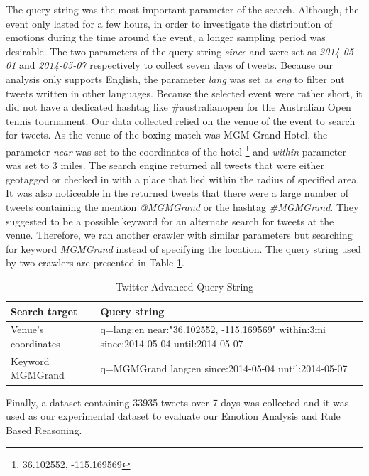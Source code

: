 The query string was the most important parameter of the search. Although, the event only lasted for a few hours, in order to investigate the distribution of emotions during the time around the event, a longer sampling period was desirable. The two parameters of the query string \textit{since} and  were set as \textit{2014-05-01} and \textit{2014-05-07} respectively to collect seven days of tweets. Because our analysis only supports English, the parameter \textit{lang} was set as \textit{eng} to filter out tweets written in other languages. Because the selected event were rather short, it did not have a dedicated hashtag like \#australianopen for the Australian Open tennis tournament. Our data collected relied on the venue of the event to search for tweets. As the venue of the boxing match was MGM Grand Hotel, the parameter \textit{near} was set to the coordinates of the hotel \footnote{36.102552, -115.169569} and \textit{within} parameter was set to 3 miles. The search engine returned all tweets that were either geotagged or checked in with a place that lied within the radius of specified area. It was also noticeable in the returned tweets that there were a large number of tweets containing the mention \textit{@MGMGrand} or the hashtag \textit{\#MGMGrand}. They suggested to be a possible keyword for an alternate search for tweets at the venue. Therefore, we ran another crawler with similar parameters but searching for keyword \textit{MGMGrand} instead of specifying the location. The query string used by two crawlers are presented in Table \ref{table:crawlerURL}. 

\begin{table}
\caption{Twitter Advanced Query String}
\label{table:crawlerURL}
\centering
\begin{tabular}{|p{4cm}|p{10cm}|}

\hline
\textbf{Search target} & \textbf{Query string} \\ \hline \hline
Venue's coordinates & q=lang:en near:"36.102552, -115.169569" within:3mi since:2014-05-04 until:2014-05-07 \\ \hline
Keyword MGMGrand & q=MGMGrand lang:en since:2014-05-04 until:2014-05-07 \\ \hline

\end{tabular}
\end{table}

Finally, a dataset containing 33935 tweets over 7 days was collected and it was used as our experimental dataset to evaluate our Emotion Analysis and Rule Based Reasoning.

